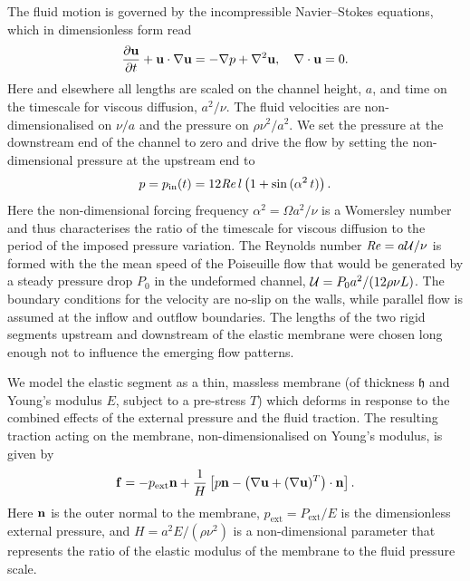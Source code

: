 \documentclass[aps,prl,reprint,superscriptaddress,floatfix]{revtex4-1}
\newcommand{\Rey}{\mathit{Re}}
\begin{document}
The fluid motion is governed by the incompressible Navier--Stokes
equations, which in dimensionless form read
\begin{equation}
\dfrac{\partial {\bf u}}{\partial t} + {\bf u} \cdot \nabla {\bf
u} = -\nabla  p + \nabla^2  {\bf u},\quad
\nabla \cdot {\bf u}= 0.
\label{eq:NSeqn}
\end{equation}
Here and elsewhere all lengths are scaled on the channel height,
$a$, and time on the timescale for viscous diffusion, $a^2/\nu$.
The fluid velocities are non-dimensionalised on $\nu/a$ and the
pressure on $\rho\nu^2/a^2$.
We set the pressure at the downstream end of the channel to zero
and drive the flow by setting the non-dimensional pressure at the
upstream end to
\begin{equation}
p = p_{\rm in}(t)=12 \Rey \,l \left(1 + \sin\,(\alpha^2 \, t)\right).
\end{equation}
Here the non-dimensional forcing frequency $\alpha^2 = \Omega a^2/\nu$ is
a Womersley number and thus characterises the ratio of the
timescale for viscous diffusion to the period of the imposed pressure variation.
The Reynolds number $\Rey = a{\cal U}/\nu$ is formed with the the mean
speed of the Poiseuille flow that would be generated by a steady pressure
drop $P_0$ in the undeformed channel, ${\cal U} = P_0 a^2/(12 \rho \nu
L)$. The boundary conditions for the velocity are no-slip on the walls,
while parallel flow is assumed at the inflow and outflow
boundaries. The lengths of the two rigid segments upstream and
downstream of the elastic membrane were chosen long enough not to
influence the emerging flow patterns. 

We model the elastic segment as a thin, massless
membrane (of thickness $\mathfrak{h}$ and Young's modulus $E$, subject to a
pre-stress $T$) which deforms in
response to the combined effects of the external pressure
and the fluid traction. The resulting traction acting on the
membrane, non-dimensionalised on Young's modulus, is given by
\begin{equation}
\label{eq:nondimloadvector}
{\bf f}=-p_\text{ext} {\bf n} + \frac{1}{H} \left[ p {\bf n} -
  \left(\nabla {\bf u} + (\nabla {\bf u})^T\right) \cdot {\bf n} \right].
\end{equation}
Here ${\bf n}$ is the outer normal to the membrane,
$p_\text{ext}=P_\text{ext}/E$ is the dimensionless external
pressure, and  $H=a^2 E/(\rho\nu^2)$  is a non-dimensional parameter
that represents the ratio of the elastic modulus of the membrane to
the fluid pressure scale. 
\end{document}
